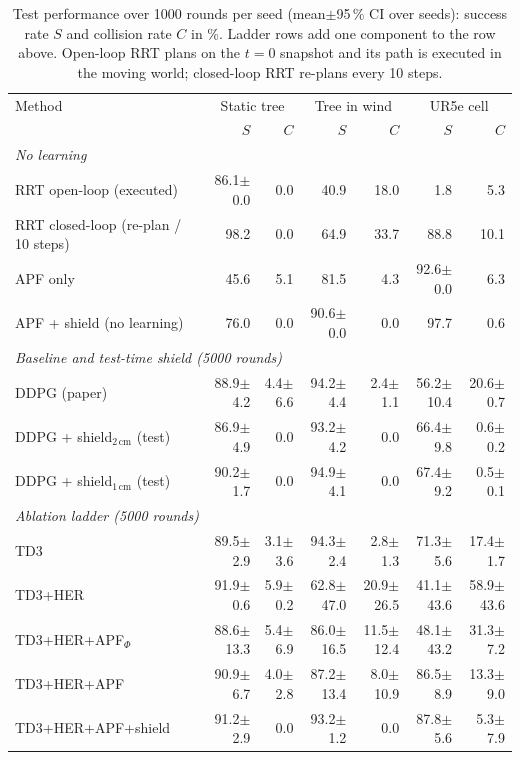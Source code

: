 \begin{table}[t]
\centering
\caption{Test performance over 1000 rounds per seed (mean$\pm$95\,\% CI over seeds): success rate $S$ and collision rate $C$ in \%. Ladder rows add one component to the row above. Open-loop RRT plans on the $t{=}0$ snapshot and its path is executed in the moving world; closed-loop RRT re-plans every 10 steps.}
\label{tab:results}
\scriptsize
\begin{tabular}{lrrrrrr}
\toprule
Method & \multicolumn{2}{c}{Static tree} & \multicolumn{2}{c}{Tree in wind} & \multicolumn{2}{c}{UR5e cell} \\
 & $S$ & $C$ & $S$ & $C$ & $S$ & $C$ \\
\midrule
\multicolumn{7}{l}{\textit{No learning}} \\
RRT open-loop (executed) & 86.1$\pm$0.0 & 0.0 & 40.9 & 18.0 & 1.8 & 5.3 \\
RRT closed-loop (re-plan / 10 steps) & 98.2 & 0.0 & 64.9 & 33.7 & 88.8 & 10.1 \\
APF only & 45.6 & 5.1 & 81.5 & 4.3 & 92.6$\pm$0.0 & 6.3 \\
APF + shield (no learning) & 76.0 & 0.0 & 90.6$\pm$0.0 & 0.0 & 97.7 & 0.6 \\
\midrule
\multicolumn{7}{l}{\textit{Baseline and test-time shield (5000 rounds)}} \\
DDPG (paper) & 88.9$\pm$4.2 & 4.4$\pm$6.6 & 94.2$\pm$4.4 & 2.4$\pm$1.1 & 56.2$\pm$10.4 & 20.6$\pm$0.7 \\
DDPG + shield$_{2\,\mathrm{cm}}$ (test) & 86.9$\pm$4.9 & 0.0 & 93.2$\pm$4.2 & 0.0 & 66.4$\pm$9.8 & 0.6$\pm$0.2 \\
DDPG + shield$_{1\,\mathrm{cm}}$ (test) & 90.2$\pm$1.7 & 0.0 & 94.9$\pm$4.1 & 0.0 & 67.4$\pm$9.2 & 0.5$\pm$0.1 \\
\midrule
\multicolumn{7}{l}{\textit{Ablation ladder (5000 rounds)}} \\
TD3 & 89.5$\pm$2.9 & 3.1$\pm$3.6 & 94.3$\pm$2.4 & 2.8$\pm$1.3 & 71.3$\pm$5.6 & 17.4$\pm$1.7 \\
TD3+HER & 91.9$\pm$0.6 & 5.9$\pm$0.2 & 62.8$\pm$47.0 & 20.9$\pm$26.5 & 41.1$\pm$43.6 & 58.9$\pm$43.6 \\
TD3+HER+APF$_\Phi$ & 88.6$\pm$13.3 & 5.4$\pm$6.9 & 86.0$\pm$16.5 & 11.5$\pm$12.4 & 48.1$\pm$43.2 & 31.3$\pm$7.2 \\
TD3+HER+APF & 90.9$\pm$6.7 & 4.0$\pm$2.8 & 87.2$\pm$13.4 & 8.0$\pm$10.9 & 86.5$\pm$8.9 & 13.3$\pm$9.0 \\
TD3+HER+APF+shield & 91.2$\pm$2.9 & 0.0 & 93.2$\pm$1.2 & 0.0 & 87.8$\pm$5.6 & 5.3$\pm$7.9 \\

\end{tabular}
\end{table}
